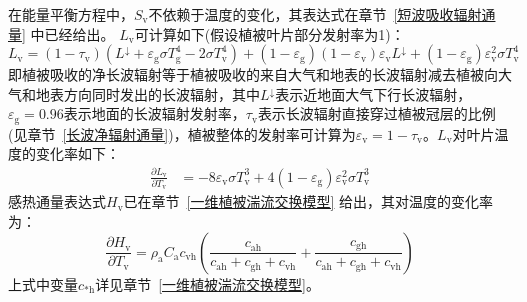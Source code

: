 在能量平衡方程中，$S_{\mathrm v}$不依赖于温度的变化，其表达式在章节~\ref{短波吸收辐射通量} 中已经给出。
$L_{\mathrm v}$可计算如下(假设植被叶片部分发射率为1)：
\begin{equation}
  L_{\mathrm{v}}=\left(1-\tau_{\mathrm{v}}\right)\left(L ^\downarrow+\varepsilon_{\mathrm{g}} \sigma T_{\mathrm{g}}^{4}-2 \sigma T_{\mathrm{v}}^{4}\right) + \left( 1- \varepsilon_{\mathrm{g}} \right )\left(1-\varepsilon_{\mathrm{v}} \right)\varepsilon_{\mathrm{v}} L^\downarrow + \left( 1- \varepsilon_{\mathrm{g}} \right ) \varepsilon_{\mathrm{v}}^2 \sigma T_{\mathrm{v}}^4
\end{equation}
即植被吸收的净长波辐射等于植被吸收的来自大气和地表的长波辐射减去植被向大气和地表方向同时发出的长波辐射，其中$L^\downarrow$表示近地面大气下行长波辐射，$\varepsilon_{\mathrm {g}} =0.96$表示地面的长波辐射发射率，$\tau_{\mathrm{v}}$表示长波辐射直接穿过植被冠层的比例(见章节~\ref{长波净辐射通量})，植被整体的发射率可计算为$\varepsilon_{\mathrm v}=1-\tau_{\mathrm v}$。$L_{\mathrm v}$对叶片温度的变化率如下：
\begin{equation}
  \begin{aligned}
    \frac{\partial L_{\mathrm{v}}}{\partial T_{\mathrm{v}}} &= -8 \varepsilon_{\mathrm{v}}\sigma T_{\mathrm{v}}^{3} + 4 \left( 1- \varepsilon_{\mathrm{g}} \right ) \varepsilon_{\mathrm{v}}^2 \sigma T_{\mathrm{v}}^3
  \end{aligned}
\end{equation}
感热通量表达式$H_{\mathrm{v}}$已在章节~\ref{一维植被湍流交换模型} 给出，其对温度的变化率为：
\begin{equation}
  \frac{\partial H_{\mathrm{v}}}{\partial T_{\mathrm{v}}}=\rho_{\mathrm{a}} C_{\mathrm{a}} c_{\mathrm{vh}} \left( \frac{c_{\mathrm{ah}}}{c_{\mathrm{ah}} + c_{\mathrm{gh}} + c_{\mathrm{vh}}} + \frac{c_{\mathrm{gh}}}{c_{\mathrm{ah}} + c_{\mathrm{gh}} + c_{\mathrm{vh}}} \right)
\end{equation}
上式中变量$c_{\mathrm{*h}}$详见章节~\ref{一维植被湍流交换模型}。

